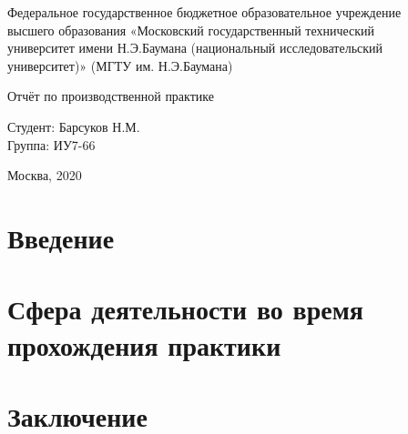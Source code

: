 \documentclass[12pt,a4paper]{scrartcl}
\begin{document}
\begin{titlepage}
\newpage
\begin{center}
Федеральное государственное бюджетное образовательное учреждение  \\
\vspace{0.25cm}%
высшего образования «Московский государственный технический  \\
\vspace{0.25cm}%
университет имени Н.Э.Баумана (национальный исследовательский \\
\vspace{0.25cm}%
университет)» (МГТУ им. Н.Э.Баумана) \\
\end{center}
\vspace{5cm}
\begin{center}
\Large Отчёт по производственной практике
\end{center}
\vspace{6em}
\begin{flushright}
Студент: \hrulefill Барсуков Н.М. \\
\vspace{1.5em}
Группа: \hrulefill ИУ7-66\\
\vspace{1.5em}
\vspace{1.5em}
\end{flushright}
\vspace{\fill}
\begin{center}
Москва, 2020
\end{center}
\end{titlepage}
\newpage
\tableofcontents
{}
\newpage

\section{Введение}


\section{Сфера деятельности во время прохождения практики}


\section{Заключение}

\end{document}
